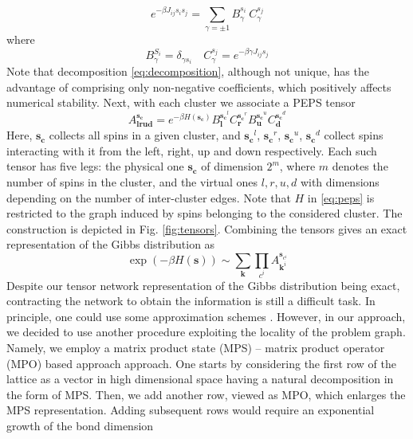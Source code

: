 \begin{equation}
  e^{-\beta J_{ij}s_i s_j} = \sum_{\gamma = \pm 1} B^{s_{i\phantom{j}}}_\gamma C^{s_j}_\gamma
\end{equation}
where
\begin{equation}
  \label{eq:decomposition}
  B^{S_i}_\gamma = \delta_{\gamma s_i} \quad C^{s_j}_\gamma = e^{-\beta \gamma J_{ij} s_j}
\end{equation}
Note that decomposition \eqref{eq:decomposition}, although not unique, has the
advantage of comprising only non-negative coefficients, which positively
affects numerical stability. Next, with each cluster we associate a PEPS tensor
\begin{equation}
  \label{eq:peps}
  A^{\mathbf{s_c}}_{\mathbf{lrud}} = e^{-\beta H(\mathbf{s_c})} B^{\mathbf{s_c}^l}_\mathbf{l}C^{\mathbf{s_c}^r}_\mathbf{r}B^{\mathbf{s_c}^u}_\mathbf{u}C^{\mathbf{s_c}^d}_\mathbf{d}
\end{equation}
Here, $\mathbf{s_c}$ collects all spins in a given cluster, and
$\mathbf{s_c}^l$, $\mathbf{s_c}^r$, $\mathbf{s_c}^u$, $\mathbf{s_c}^d$ collect
spins interacting with it from the left, right, up and down respectively. Each
such tensor has five legs: the physical one $\mathbf{s_c}$ of dimension $2^m$,
where $m$ denotes the number of spins in the cluster, and the virtual ones $l,
  r, u, d$ with dimensions depending on the number of inter-cluster edges. Note
that $H$ in \eqref{eq:peps} is restricted to the graph induced by spins
belonging to the considered cluster. The construction is depicted in Fig.
\ref{fig:tensors}. Combining the tensors gives an exact representation of the
Gibbs distribution as
\begin{equation}
  \exp(-\beta H(\mathbf{s})) \sim \sum_{\mathbf{k}}\prod_{c^{i}}A_{\mathbf{k}^{i}}^{\mathbf{s}_{c^{i}}}
\end{equation}
Despite our tensor network representation of the Gibbs distribution being
exact, contracting the network to obtain the information is still a difficult
task. In principle, one could use some approximation schemes \cite{lewenstein}.
However, in our approach, we decided to use another procedure exploiting the
locality of the problem graph. Namely, we employ a matrix product state (MPS)
-- matrix product operator (MPO) based approach \cite{murg} approach. One
starts by considering the first row of the lattice as a vector in high
dimensional space having a natural decomposition in the form of MPS. Then, we
add another row, viewed as MPO, which enlarges the MPS representation. Adding
subsequent rows would require an exponential growth of the bond dimension
